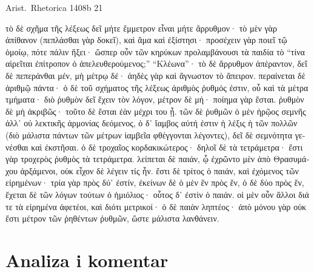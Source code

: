 Arist.\ Rhetorica 1408b 21


\medskip

{\large
\begin{greek}
\noindent τὸ δὲ σχῆμα τῆς λέξεως δεῖ μήτε ἔμμετρον εἶναι μήτε ἄρρυθμον· τὸ μὲν γὰρ ἀπίθανον (πεπλάσθαι γὰρ δοκεῖ), καὶ ἅμα καὶ ἐξίστησι· προσέχειν γὰρ ποιεῖ τῷ ὁμοίῳ, πότε πάλιν ἥξει· ὥσπερ οὖν τῶν κηρύκων προλαμβάνουσι τὰ παιδία τὸ ``τίνα αἱρεῖται ἐπίτροπον ὁ ἀπελευθερούμενος;'' ``Κλέωνα''· τὸ δὲ ἄρρυθμον ἀπέραντον, δεῖ δὲ πεπεράνθαι μέν, μὴ μέτρῳ δέ· ἀηδὲς γὰρ καὶ ἄγνωστον τὸ ἄπειρον. περαίνεται δὲ ἀριθμῷ πάντα· ὁ δὲ τοῦ σχήματος τῆς λέξεως ἀριθμὸς ῥυθμός ἐστιν, οὗ καὶ τὰ μέτρα τμήματα· διὸ ῥυθμὸν δεῖ ἔχειν τὸν λόγον, μέτρον δὲ μή· ποίημα γὰρ ἔσται. ῥυθμὸν δὲ μὴ ἀκριβῶς· τοῦτο δὲ ἔσται ἐὰν μέχρι του ᾖ. τῶν δὲ ῥυθμῶν ὁ μὲν ἡρῷος σεμνῆς ἀλλ᾽ οὐ λεκτικῆς ἁρμονίας δεόμενος, ὁ δ᾽ ἴαμβος αὐτή ἐστιν ἡ λέξις ἡ τῶν πολλῶν (διὸ μάλιστα πάντων τῶν μέτρων ἰαμβεῖα φθέγγονται λέγοντες), δεῖ δὲ σεμνότητα γενέσθαι καὶ ἐκστῆσαι. ὁ δὲ τροχαῖος κορδακικώτερος· δηλοῖ δὲ τὰ τετράμετρα· ἔστι γὰρ τροχερὸς ῥυθμὸς τὰ τετράμετρα. λείπεται δὲ παιάν, ᾧ ἐχρῶντο μὲν ἀπὸ Θρασυμάχου ἀρξάμενοι, οὐκ εἶχον δὲ λέγειν τίς ἦν. ἔστι δὲ τρίτος ὁ παιάν, καὶ ἐχόμενος τῶν εἰρημένων· τρία γὰρ πρὸς δύ᾽ ἐστίν, ἐκείνων δὲ ὁ μὲν ἓν πρὸς ἕν, ὁ δὲ δύο πρὸς ἕν, ἔχεται δὲ τῶν λόγων τούτων ὁ ἡμιόλιος· οὗτος δ᾽ ἐστὶν ὁ παιάν. οἱ μὲν οὖν ἄλλοι διά τε τὰ εἰρημένα ἀφετέοι, καὶ διότι μετρικοί· ὁ δὲ παιὰν ληπτέος· ἀπὸ μόνου γὰρ οὐκ ἔστι μέτρον τῶν ῥηθέντων ῥυθμῶν, ὥστε μάλιστα λανθάνειν.

\end{greek}
}

\newpage

\section*{Analiza i komentar}


